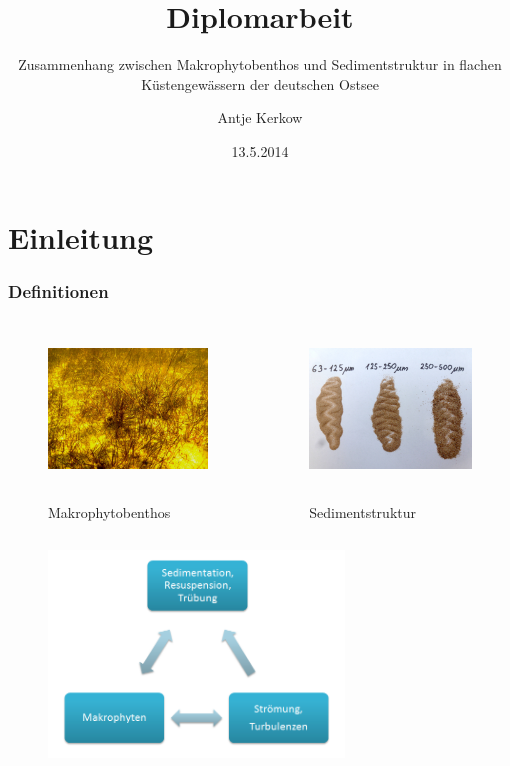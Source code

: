 \documentclass{beamer}
\title{Diplomarbeit}
\subtitle{Zusammenhang zwischen Makrophytobenthos und Sedimentstruktur in flachen Küstengewässern der deutschen Ostsee}
\author{Antje Kerkow}
\institute[Universität Greifswald]{Studiengang Landschaftsökologie und Naturschutz}
\date{13.5.2014}
\begin{document}
\begin{frame}
\titlepage
\end{frame}

\section{Einleitung}
\begin{frame}
\frametitle{Definitionen}
\begin{columns}
\begin{column}{5.5cm}
\begin{figure}
\includegraphics[height=40mm]{images/Fotos/makrophytobenthos.jpg}

Makrophytobenthos
\end{figure}
\end{column}
\begin{column}{5.5cm}
\begin{figure}
\includegraphics[height=40mm]{images/Fotos/korngroessen.jpg}

Sedimentstruktur
\end{figure}
\end{column}
\end{columns}
\end{frame}

\begin{frame}
\begin{figure}
\includegraphics[width=0.7\textwidth]{images/Schema_Pfl_Sedim_Strm}
\end{figure}
\end{frame}
\end{document}
